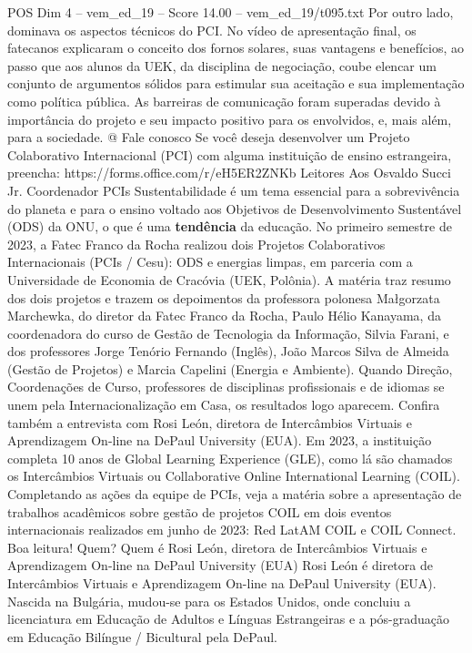 \begin{textsample}{POS Dim 4 – vem\_ed\_19 – Score 14.00 – vem\_ed\_19/t095.txt}
Por outro lado, dominava os aspectos técnicos do PCI.
No vídeo de apresentação final, os fatecanos explicaram o conceito dos fornos solares, suas vantagens e benefícios, ao passo que aos alunos da UEK, da disciplina de negociação, coube elencar um conjunto de argumentos sólidos para estimular sua aceitação e sua implementação como política pública.
As barreiras de comunicação foram superadas devido à importância do projeto e seu impacto positivo para os envolvidos, e, mais além, para a sociedade. @ Fale conosco Se você deseja desenvolver um Projeto Colaborativo Internacional (PCI) com alguma instituição de ensino estrangeira, preencha: https://forms.office.com/r/eH5ER2ZNKb Leitores Aos Osvaldo Succi Jr.
Coordenador PCIs Sustentabilidade é um tema essencial para a sobrevivência do planeta e para o ensino voltado aos Objetivos de Desenvolvimento Sustentável (ODS) da ONU, o que é uma \textbf{tendência} da educação.
No primeiro semestre de 2023, a Fatec Franco da Rocha realizou dois Projetos Colaborativos Internacionais (PCIs / Cesu): ODS e energias limpas, em parceria com a Universidade de Economia de Cracóvia (UEK, Polônia).
A matéria traz resumo dos dois projetos e trazem os depoimentos da professora polonesa Małgorzata Marchewka, do diretor da Fatec Franco da Rocha, Paulo Hélio Kanayama, da coordenadora do curso de Gestão de Tecnologia da Informação, Silvia Farani, e dos professores Jorge Tenório Fernando (Inglês), João Marcos Silva de Almeida (Gestão de Projetos) e Marcia Capelini (Energia e Ambiente).
Quando Direção, Coordenações de Curso, professores de disciplinas profissionais e de idiomas se unem pela Internacionalização em Casa, os resultados logo aparecem.
Confira também a entrevista com Rosi León, diretora de Intercâmbios Virtuais e Aprendizagem On-line na DePaul University (EUA).
Em 2023, a instituição completa 10 anos de Global Learning Experience (GLE), como lá são chamados os Intercâmbios Virtuais ou Collaborative Online International Learning (COIL).
Completando as ações da equipe de PCIs, veja a matéria sobre a apresentação de trabalhos acadêmicos sobre gestão de projetos COIL em dois eventos internacionais realizados em junho de 2023: Red LatAM COIL e COIL Connect.
Boa leitura!
Quem?
Quem é Rosi León, diretora de Intercâmbios Virtuais e Aprendizagem On-line na DePaul University (EUA) Rosi León é diretora de Intercâmbios Virtuais e Aprendizagem On-line na DePaul University (EUA).
Nascida na Bulgária, mudou-se para os Estados Unidos, onde concluiu a licenciatura em Educação de Adultos e Línguas Estrangeiras e a pós-graduação em Educação Bilíngue / Bicultural pela DePaul.

\end{textsample}
